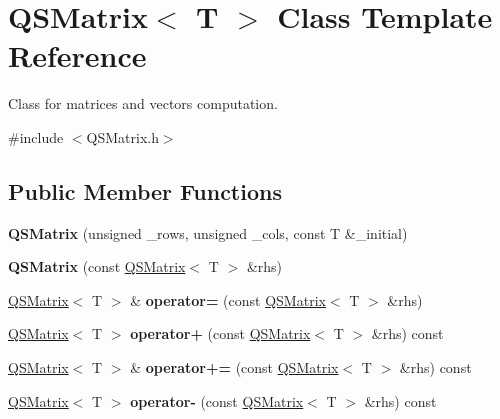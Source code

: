 \hypertarget{classQSMatrix}{}\section{Q\+S\+Matrix$<$ T $>$ Class Template Reference}
\label{classQSMatrix}


Class for matrices and vectors computation.  




{\ttfamily \#include $<$Q\+S\+Matrix.\+h$>$}

\subsection*{Public Member Functions}
\begin{DoxyCompactItemize}
\item 
\mbox{\label{classQSMatrix_a66d487621e45fec22c61bd50559fc03c}} 
{\bfseries Q\+S\+Matrix} (unsigned \+\_\+rows, unsigned \+\_\+cols, const T \&\+\_\+initial)
\item 
\mbox{\label{classQSMatrix_ad21ae4a20d9cb12732b0d09f33243670}} 
{\bfseries Q\+S\+Matrix} (const \hyperlink{classQSMatrix}{Q\+S\+Matrix}$<$ T $>$ \&rhs)
\item 
\mbox{\label{classQSMatrix_ab3f16a01a06b684e0e145422ac0d1ba2}} 
\hyperlink{classQSMatrix}{Q\+S\+Matrix}$<$ T $>$ \& {\bfseries operator=} (const \hyperlink{classQSMatrix}{Q\+S\+Matrix}$<$ T $>$ \&rhs)
\item 
\mbox{\label{classQSMatrix_ab317d80656300d78a8d4b4067ca8146a}} 
\hyperlink{classQSMatrix}{Q\+S\+Matrix}$<$ T $>$ {\bfseries operator+} (const \hyperlink{classQSMatrix}{Q\+S\+Matrix}$<$ T $>$ \&rhs) const
\item 
\mbox{\label{classQSMatrix_a6851aa8584d3d59c17a44b2c9c401b0c}} 
\hyperlink{classQSMatrix}{Q\+S\+Matrix}$<$ T $>$ \& {\bfseries operator+=} (const \hyperlink{classQSMatrix}{Q\+S\+Matrix}$<$ T $>$ \&rhs) const
\item 
\mbox{\label{classQSMatrix_a573770f6adfb22b2ef9ec91a35e5f910}} 
\hyperlink{classQSMatrix}{Q\+S\+Matrix}$<$ T $>$ {\bfseries operator-\/} (const \hyperlink{classQSMatrix}{Q\+S\+Matrix}$<$ T $>$ \&rhs) const

\end{DoxyCompactItemize}
